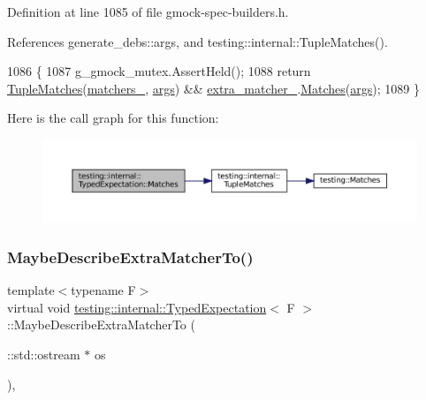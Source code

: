 Definition at line 1085 of file gmock-\/spec-\/builders.\+h.



References generate\+\_\+debs\+::args, and testing\+::internal\+::\+Tuple\+Matches().


\begin{DoxyCode}
1086                                                     \{
1087     g\_gmock\_mutex.AssertHeld();
1088     \textcolor{keywordflow}{return} \hyperlink{namespacetesting_1_1internal_a10095d1e1c99369200072b39d657ebc4}{TupleMatches}(\hyperlink{classtesting_1_1internal_1_1TypedExpectation_a40c442a0e8fffc8bf94611a8130998bf}{matchers\_}, \hyperlink{namespacegenerate__debs_a75f9143e38df82d83b2e8a6f99cae02c}{args}) && 
      \hyperlink{classtesting_1_1internal_1_1TypedExpectation_a7d2fef3d4429a3a350282e6030a45ba4}{extra\_matcher\_}.\hyperlink{classtesting_1_1internal_1_1MatcherBase_a3b479673ff40cac1a7d548e91d789cb2}{Matches}(\hyperlink{namespacegenerate__debs_a75f9143e38df82d83b2e8a6f99cae02c}{args});
1089   \}
\end{DoxyCode}
Here is the call graph for this function\+:
\nopagebreak
\begin{figure}[H]
\begin{center}
\leavevmode
\includegraphics[width=350pt]{classtesting_1_1internal_1_1TypedExpectation_a010336f587859d990b718cd74f13e617_cgraph}
\end{center}
\end{figure}
\mbox{\label{classtesting_1_1internal_1_1TypedExpectation_ab019251041a408dc5a5d8ae216be53f4}} 
\subsubsection{\texorpdfstring{Maybe\+Describe\+Extra\+Matcher\+To()}{MaybeDescribeExtraMatcherTo()}}
{\footnotesize\ttfamily template$<$typename F$>$ \\
virtual void \hyperlink{classtesting_1_1internal_1_1TypedExpectation}{testing\+::internal\+::\+Typed\+Expectation}$<$ F $>$\+::Maybe\+Describe\+Extra\+Matcher\+To (\begin{DoxyParamCaption}\item[{\+::std\+::ostream $\ast$}]{os }\end{DoxyParamCaption})\hspace{0.3cm}{\ttfamily [inline]}, {\ttfamily [virtual]}}



